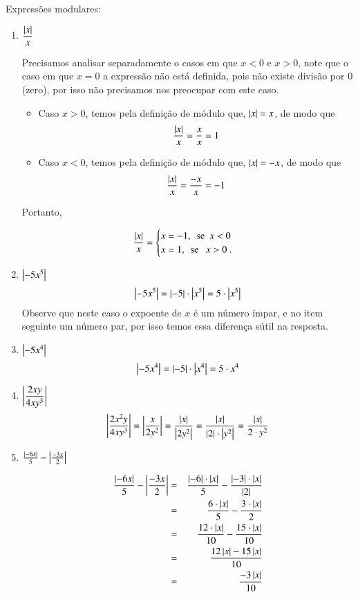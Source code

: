 \begin{exem} Expressões modulares:
 \begin{enumerate}
  \item $\dfrac{\left|x\right|}{x}$

  Precisamos analisar separadamente o casos em que $x<0$ e $x>0$, note que o caso em que $x=0$ a expressão não está definida, pois não existe divisão por $0$ (zero), por isso não precisamos nos preocupar com este caso.

  \begin{itemize}
   \item Caso $x> 0$, temos pela definição de módulo que, $\left|x\right|= x$, de modo que
   \[\frac{\left|x\right|}{x}=\frac{x}{x}= 1\]
   \item Caso $x< 0$, temos pela definição de módulo que, $\left|x\right|= -x$, de modo que
   \[\frac{\left|x\right|}{x}=\frac{-x}{x}= -1\]
  \end{itemize}

 Portanto,

  \[ \frac{\left|x\right|}{x} = \begin{cases}
      x= -1, \ \ \text{se} \ \ x< 0 \\
      x= 1, \ \ \text{se } \ \ x> 0 \ .
     \end{cases}
  \]


 \item $\left|-5x^5\right|$
 \[\left|-5x^5\right|= \left|-5\right|\cdot \left|x^5\right|= 5 \cdot \left|x^5\right|\]
 Observe que neste caso o expoente de $x$ é um número ímpar, e no item seguinte um número par, por isso temos essa diferença sútil na resposta.

 \item $\left|-5x^4\right|$
 \[\left|-5x^4\right|= \left|-5\right|\cdot \left|x^4\right|= 5 \cdot x^4\]

 \item $\left|\dfrac{2xy}{4xy^3}\right|$
 \[\left|\frac{2x^2y}{4xy^3}\right| = \left|\frac{x}{2y^2}\right|= \frac{\left|x\right|}{\left|2y^2\right|}= \frac{\left|x\right|}{\left|2\right| \cdot \left|y^2\right|}= \frac{\left|x\right|}{2 \cdot y^2}\]

 \item $\frac{\left|-6x\right|}{5} - \left|\frac{-3x}{2}\right|$

 \begin{eqnarray*}
  \frac{\left|-6x\right|}{5} - \left|\frac{-3x}{2}\right| &=&
 \frac{\left|-6\right|\cdot \left|x\right|}{5} - \frac{\left|-3\right| \cdot \left|x\right|}{\left|2\right|} \\
 &=& \frac{6 \cdot \left|x\right|}{5} - \frac{ 3 \cdot \left|x\right|}{2} \\
 &=& \frac{12 \cdot \left|x\right|}{10} - \frac{15 \cdot \left|x\right|}{10} \\
 &=& \frac{12\left|x\right| - 15\left|x\right|}{10} \\
 &=& \frac{-3\left|x\right|}{10}
 \end{eqnarray*}


\end{enumerate}
\end{exem}

